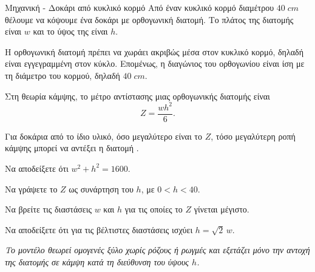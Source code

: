 \begin{problhma}{Μηχανική - Δοκάρι από κυκλικό κορμό}
Από έναν κυκλικό κορμό διαμέτρου $40\;\si{cm}$ θέλουμε να κόψουμε ένα
δοκάρι με ορθογωνική διατομή. Το πλάτος της διατομής είναι $w$ και το
ύψος της είναι $h$.

Η ορθογωνική διατομή πρέπει να χωράει ακριβώς μέσα στον κυκλικό κορμό,
δηλαδή είναι εγγεγραμμένη στον κύκλο. Επομένως, η διαγώνιος του
ορθογωνίου είναι ίση με τη διάμετρο του κορμού, δηλαδή $40\;\si{cm}$.

\begin{center}
\end{center}

Στη θεωρία κάμψης, το μέτρο αντίστασης μιας ορθογωνικής διατομής είναι
\[
  Z=\frac{wh^2}{6}.
\]

Για δοκάρια από το ίδιο υλικό, όσο μεγαλύτερο είναι το $Z$, τόσο
μεγαλύτερη ροπή κάμψης μπορεί να αντέξει η διατομή
\cite{roark2020stressStrain}.

\begin{alist}
  \item Να αποδείξετε ότι $w^2+h^2=1600.$
  \item Να γράψετε το $Z$ ως συνάρτηση του $h$, με $0<h<40$.
  \item Να βρείτε τις διαστάσεις $w$ και $h$ για τις οποίες το $Z$
        γίνεται μέγιστο.
  \item Να αποδείξετε ότι για τις βέλτιστες διαστάσεις ισχύει
        $h=\sqrt2\,w$.
\end{alist}

\textit{Το μοντέλο θεωρεί ομογενές ξύλο χωρίς ρόζους ή ρωγμές και
εξετάζει μόνο την αντοχή της διατομής σε κάμψη κατά τη διεύθυνση του
ύψους $h$.}
\end{problhma}

